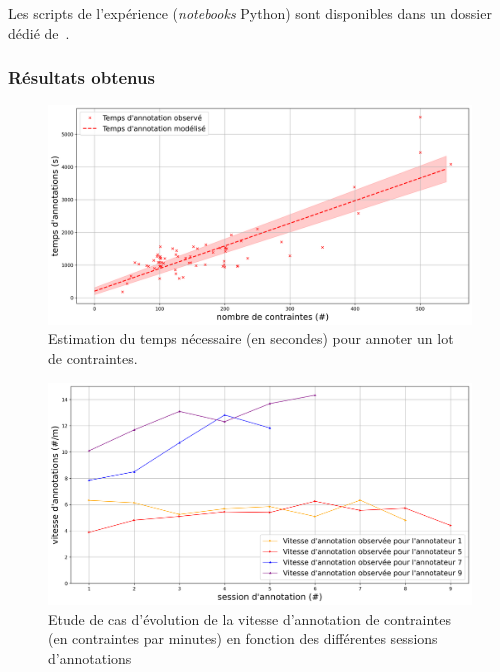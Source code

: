			\begin{leftBarInformation}
				Les scripts de l'expérience (\textit{notebooks} Python) sont disponibles dans un dossier dédié de~\cite{schild:cognitivefactory-interactive-clustering-comparative-study:2021}.
			\end{leftBarInformation}

		\subsubsection{Résultats obtenus}
		
			\begin{figure}[!htb]
				\centering
				\includegraphics[width=\textwidth]{figures/etude-temps-annotation-1-modelisation-temps}
				\caption{Estimation du temps nécessaire (en secondes) pour annoter un lot de contraintes.}
				\label{figure:4.3.2-ETUDE-COUTS-TEMPS-ANNOTATION-SIMULATION}
			\end{figure}
			
		
			\begin{figure}[!htb]
				\centering
				\includegraphics[width=\textwidth]{figures/etude-temps-annotation-3-etude-de-cas}
				\caption{Etude de cas d'évolution de la vitesse d'annotation de contraintes (en contraintes par minutes) en fonction des différentes sessions d'annotations}
				\label{figure:4.3.2-ETUDE-COUTS-TEMPS-ANNOTATION-EXEMPLE}
			\end{figure}

